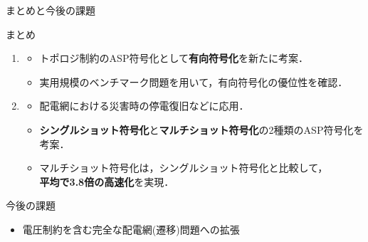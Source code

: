 \documentclass[dvipdfmx,11pt]{beamer}
\begin{document}
\begin{frame}{まとめと今後の課題}
 \begin{block}{まとめ}
 \begin{enumerate}
   \item {}
   \begin{itemize}
    \item トポロジ制約のASP符号化として\textbf{有向符号化}を新たに考案．
    \item 実用規模のベンチマーク問題を用いて，有向符号化の優位性を確認．
   \end{itemize}
   \item {}
   \begin{itemize}
    \item 配電網における災害時の停電復旧などに応用．
    \item \textbf{シングルショット符号化}と\textbf{マルチショット符号化}の2種類のASP符号化を考案．
    \item マルチショット符号化は，シングルショット符号化と比較して，\\ 
          \textbf{平均で3.8倍の高速化}を実現．
   \end{itemize}
 \end{enumerate}
 \end{block}
 \vfill
 \begin{alertblock}{今後の課題}
  \begin{itemize}
   \item 電圧制約を含む完全な配電網(遷移)問題への拡張
  \end{itemize}
 \end{alertblock}
\end{frame}
\end{document}
